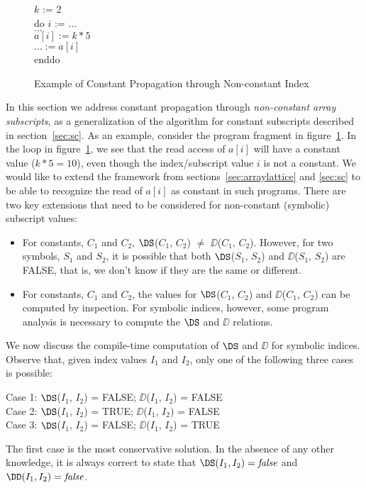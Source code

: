 \begin{figure}
\begin{center}
\parbox{3.0in}{
\begin{programa}
\Ta $k$ := 2 \\
\Ta do $i$ := $\ldots$ \\
\Tb  $\ldots$ \\
\Tb  $a[i] := k * 5$ \\
\Tb  $\ldots := a[i]$ \\
\Ta enddo \\
\end{programa}
}
\end{center}
\caption{Example of Constant Propagation through Non-constant Index}
\label{fig:non-const-ex-source}
\end{figure}

In this section we address constant propagation
through {\it non-constant array subscripts}, as a generalization
of the algorithm
for constant subscripts described in section~\ref{sec:sc}.
As an example, consider the program fragment in
figure~\ref{fig:non-const-ex-source}.  In the loop in
figure~\ref{fig:non-const-ex-source}, we see that the read access of
$a[i]$ will have a constant value ($k*5=10$), even though the
index/subscript value $i$ is not a constant.  We would like to extend
the framework from sections~\ref{sec:arraylattice} and \ref{sec:sc} to be
able to recognize the read of $a[i]$ as constant in such programs.
There are two key extensions that need to be considered
for non-constant (symbolic) subscript values:
\begin{itemize}

\item  For constants, $C_1$ and $C_2$, $\DS$($C_1$, $C_2$) $\neq$ 
$\DD$($C_1$, $C_2$). However, for two symbols,  $S_1$ and $S_2$,
it is possible that both $\DS$($S_1$, $S_2$) and $\DD$($S_1$,
$S_2$) are FALSE, that is, we don't know if they are the same or different.

\item For constants, $C_1$ and $C_2$, the values for $\DS$($C_1$, $C_2$) and 
$\DD$($C_1$, $C_2$) can be computed by inspection. For symbolic
indices, however, some program analysis is necessary
to compute the $\DS$ and $\DD$ relations.
\end{itemize} 

We now discuss the compile-time
computation of $\DS$ and $\DD$ for symbolic
indices. 
Observe that,
given index values $I_1$ and $I_2$, only one of the following three cases
is possible:
\begin{center}
\parbox{3.0in}{
\begin{programa}
Case 1:   $\DS$($I_1$, $I_2$) = FALSE; $\DD$($I_1$, $I_2$) = FALSE \\
Case 2:   $\DS$($I_1$, $I_2$) = TRUE; $\DD$($I_1$, $I_2$) = FALSE \\
Case 3:   $\DS$($I_1$, $I_2$) = FALSE; $\DD$($I_1$, $I_2$) = TRUE \\
\end{programa}
}
\end{center}
The first case is the most conservative solution.  In the absence of
any other knowledge, it is always correct to state that
$\DS(I_1,I_2) = \mbox{\it false}$ and $\DD(I_1,I_2) = \mbox{\it
false}$.

